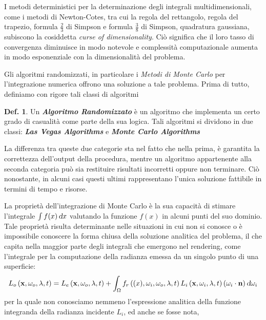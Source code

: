 \documentclass[12pt, openany]{book}
\theoremstyle{definition}
\newtheorem{definition}{Def.}
\newcommand*\dif{\mathop{}\!\textnormal{\slshape d}}
\begin{document}
I metodi deterministici per la determinazione degli integrali multidimensionali, come i metodi di Newton-Cotes, tra cui la regola del rettangolo, 
regola del trapezio, formula $\frac{2}{3}$ di Simpson e formula $\frac{3}{8}$ di Simpson, quadratura gaussiana, subiscono la cosiddetta 
\textit{curse of dimensionality}. Ci\`o significa che il loro tasso di convergenza diminuisce in modo notevole e complessit\`a computazionale aumenta
in modo esponenziale con la dimensionalit\`a del problema.\par
Gli algoritmi randomizzati, in particolare i \textit{Metodi di Monte Carlo} per l'integrazione numerica offrono una soluzione a tale problema.
Prima di tutto, definiamo con rigore tali classi di algoritmi
\begin{definition}
    Un \textsl{\textbf{Algoritmo Randomizzato}} \`e un algoritmo che implementa un certo grado di casualit\`a come parte della sua logica.
    Tali algoritmi si dividono in due classi: \textsl{\textbf{Las Vegas Algorithms}} e \textsl{\textbf{Monte Carlo Algorithms}}
\end{definition}
La differenza tra queste due categorie sta nel fatto che nella prima, \`e garantita la correttezza dell'output della procedura, mentre un algoritmo 
appartenente alla seconda categoria pu\`o sia restituire risultati incorretti oppure non terminare. Ci\`o nonostante, in alcuni casi questi ultimi
rappresentano l'unica soluzione fattibile in termini di tempo e risorse.\par
La propriet\`a dell'integrazione di Monte Carlo \`e la sua capacit\`a di stimare l'integrale $\int f(x)\dif{x}$ valutando la funzione
$f(x)$ in alcuni punti del suo dominio. Tale propriet\`a risulta determinante nelle situazioni in cui non si conosce o \`e impossibile conoscere la
forma chiusa della soluzione analitica del problema, il che capita nella maggior parte degli integrali che emergono nel rendering, come l'integrale
per la computazione della radianza emessa da un singolo punto di una superficie:
\begin{displaymath}
    L_o\left(\mathbf{x}, \omega_o, \lambda, t\right) = L_e\left(\mathbf{x}, \omega_o, \lambda, t\right) + %
        \int_\Omega f_r\left(\mathbf(x), \omega_i, \omega_o, \lambda, t\right)L_i\left(\mathbf{x}, \omega_i, \lambda, t\right) %
        \left(\omega_i \cdot \mathbf{n}\right)\dif{\omega_i}
\end{displaymath}
per la quale non conosciamo nemmeno l'espressione analitica della funzione integranda della radianza incidente $L_i$, ed anche se fosse nota, 
\end{document}
